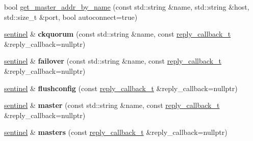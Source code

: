 \begin{DoxyCompactItemize}
\item 
bool \mbox{\hyperlink{classcpp__redis_1_1sentinel_a2886493b40b00dfafdd3b22dfe28e0c3}{get\+\_\+master\+\_\+addr\+\_\+by\+\_\+name}} (const std\+::string \&name, std\+::string \&host, std\+::size\+\_\+t \&port, bool autoconnect=true)
\item 
\mbox{\label{classcpp__redis_1_1sentinel_aaed03955e468d9f7c3df37376ecafc3a}} 
\mbox{\hyperlink{classcpp__redis_1_1sentinel}{sentinel}} \& {\bfseries ckquorum} (const std\+::string \&name, const \mbox{\hyperlink{classcpp__redis_1_1sentinel_ae1a150ff8787208c47414397a061c9a7}{reply\+\_\+callback\+\_\+t}} \&reply\+\_\+callback=nullptr)
\item 
\mbox{\label{classcpp__redis_1_1sentinel_abd4ee07b5a17ca15b74d25702687e53a}} 
\mbox{\hyperlink{classcpp__redis_1_1sentinel}{sentinel}} \& {\bfseries failover} (const std\+::string \&name, const \mbox{\hyperlink{classcpp__redis_1_1sentinel_ae1a150ff8787208c47414397a061c9a7}{reply\+\_\+callback\+\_\+t}} \&reply\+\_\+callback=nullptr)
\item 
\mbox{\label{classcpp__redis_1_1sentinel_ab3c3a6822ebd512217280b0ca1a0f29f}} 
\mbox{\hyperlink{classcpp__redis_1_1sentinel}{sentinel}} \& {\bfseries flushconfig} (const \mbox{\hyperlink{classcpp__redis_1_1sentinel_ae1a150ff8787208c47414397a061c9a7}{reply\+\_\+callback\+\_\+t}} \&reply\+\_\+callback=nullptr)
\item 
\mbox{\label{classcpp__redis_1_1sentinel_a3d08fbc6ae90b93613f0b3c56a6bf1fe}} 
\mbox{\hyperlink{classcpp__redis_1_1sentinel}{sentinel}} \& {\bfseries master} (const std\+::string \&name, const \mbox{\hyperlink{classcpp__redis_1_1sentinel_ae1a150ff8787208c47414397a061c9a7}{reply\+\_\+callback\+\_\+t}} \&reply\+\_\+callback=nullptr)
\item 
\mbox{\label{classcpp__redis_1_1sentinel_aed4cacf43432630eb2934ce8b8dec104}} 
\mbox{\hyperlink{classcpp__redis_1_1sentinel}{sentinel}} \& {\bfseries masters} (const \mbox{\hyperlink{classcpp__redis_1_1sentinel_ae1a150ff8787208c47414397a061c9a7}{reply\+\_\+callback\+\_\+t}} \&reply\+\_\+callback=nullptr)
\item 
\mbox{\label{classcpp__redis_1_1sentinel_ad4ae72b60a5a03977cda0d3e1f4ee48d}} 

\end{DoxyCompactItemize}
